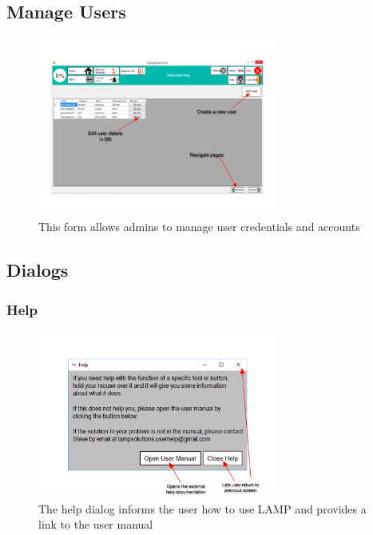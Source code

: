 \documentclass[oneside,openany,11pt,a4paper]{report}
\begin{document}
\subsection{Manage Users}
\begin{figure}[H]
	\centering
	\includegraphics[width=0.7\textwidth]{screen/manageuser.png}
	\caption{This form allows admins to manage user credentials and accounts}
\end{figure}




\subsection{Dialogs}

\subsubsection{Help}
\begin{figure}[H]
	\centering
	
	\includegraphics[width=0.7\textwidth]{screen/help.png}
	\caption{The help dialog informs the user how to use LAMP and provides a link to the user manual}
\end{figure}
\end{document}
